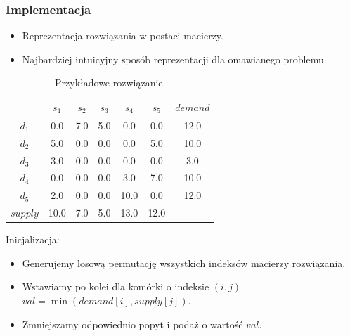 \documentclass{beamer}
\begin{document}
\begin{frame}
\frametitle{Implementacja}
 {
    \begin{itemize}
        \item Reprezentacja rozwiązania w postaci macierzy.
        \item Najbardziej intuicyjny sposób reprezentacji dla omawianego problemu.
    \end{itemize}
    \begin{table}
        \begin{center}
            \begin{tabular}{c||ccccc||c}
                & $s_1$ & $s_2$ & $s_3$ & $s_4$ & $s_5$ & $demand$ \\ 
                \hline
                \hline
                $d_1$ & 0.0 & 7.0 & 5.0 & 0.0 & 0.0 & 12.0 \\
                $d_2$ & 5.0 & 0.0 & 0.0 & 0.0 & 5.0 & 10.0 \\
                $d_3$ & 3.0 & 0.0 & 0.0 & 0.0 & 0.0 & 3.0 \\
                $d_4$ & 0.0 & 0.0 & 0.0 & 3.0 & 7.0 & 10.0 \\
                $d_5$ & 2.0 & 0.0 & 0.0 & 10.0 & 0.0 & 12.0 \\
                \hline
                \hline
                $supply$ & 10.0 & 7.0 & 5.0 & 13.0 & 12.0 & \\ 
            \end{tabular}
        \end{center}
        \caption{Przykładowe rozwiązanie.}
    \end{table}
}

 {
    Inicjalizacja:
    \begin{itemize}
        \item Generujemy losową permutację wszystkich indeksów macierzy rozwiązania.
        \item Wstawiamy po kolei dla komórki o indeksie $(i, j)$ $val = \min(demand[i], supply[j])$.
        \item Zmniejszamy odpowiednio popyt i podaż o wartość $val$. 
    \end{itemize}
}


\end{frame}
\end{document}
